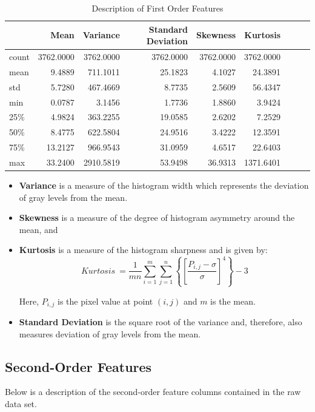 \documentclass{article}
\begin{document}
\begin{table}[H]
    \centering
    \begin{tabular}{lrrrrrrrr}
    \toprule
     & Mean & Variance & Standard Deviation & Skewness & Kurtosis \\
    \midrule
    count & 3762.0000 & 3762.0000 & 3762.0000 & 3762.0000 & 3762.0000 \\
    mean & 9.4889 & 711.1011 & 25.1823 & 4.1027 & 24.3891 \\
    std & 5.7280 & 467.4669 & 8.7735 & 2.5609 & 56.4347 \\
    min & 0.0787 & 3.1456 & 1.7736 & 1.8860 & 3.9424 \\
    25\% & 4.9824 & 363.2255 & 19.0585 & 2.6202 & 7.2529 \\
    50\% & 8.4775 & 622.5804 & 24.9516 & 3.4222 & 12.3591 \\
    75\% & 13.2127 & 966.9543 & 31.0959 & 4.6517 & 22.6403 \\
    max & 33.2400 & 2910.5819 & 53.9498 & 36.9313 & 1371.6401 \\
    \bottomrule
    \end{tabular}
    \caption{Description of First Order Features}
    \label{fo-features}
\end{table}

\begin{itemize}
    \item  \textbf{Variance} is a measure of the histogram width which represents the deviation of gray levels from the mean. 
    \item \textbf{Skewness} is a measure of the degree of histogram asymmetry around the mean, and 
    \item \textbf{Kurtosis} is a measure of the histogram sharpness and is given by:
\[
Kurtosis\ = \frac{1}{mn}\sum\limits_{i=1}^m\sum\limits_{j=1}^n\left\{\left[\frac{P_{i,j}-\sigma}{\sigma}\right]^4\right\}-3
\]

Here, $P_{i,j}$ is the pixel value at point $(i,j)$ and $m$ is the mean.
    \item \textbf{Standard Deviation} is the square root of the variance and, therefore, also measures deviation of gray levels from the mean.
\end{itemize}


\subsection{Second-Order Features}
Below is a description of the second-order feature columns contained in the raw data set.
\end{document}
